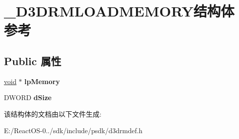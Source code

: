 \hypertarget{struct___d3_d_r_m_l_o_a_d_m_e_m_o_r_y}{}\section{\+\_\+\+D3\+D\+R\+M\+L\+O\+A\+D\+M\+E\+M\+O\+R\+Y结构体 参考}
\label{struct___d3_d_r_m_l_o_a_d_m_e_m_o_r_y}
\subsection*{Public 属性}
\begin{DoxyCompactItemize}
\item 
\mbox{\label{struct___d3_d_r_m_l_o_a_d_m_e_m_o_r_y_a3243cf4e6c9e21f9b7eae5bc1d6f7c0f}} 
\hyperlink{interfacevoid}{void} $\ast$ {\bfseries lp\+Memory}
\item 
\mbox{\label{struct___d3_d_r_m_l_o_a_d_m_e_m_o_r_y_a5bc37b52c91a4417637eddb5997e28da}} 
D\+W\+O\+RD {\bfseries d\+Size}
\end{DoxyCompactItemize}


该结构体的文档由以下文件生成\+:\begin{DoxyCompactItemize}
\item 
E\+:/\+React\+O\+S-\/0../sdk/include/psdk/d3drmdef.\+h\end{DoxyCompactItemize}
